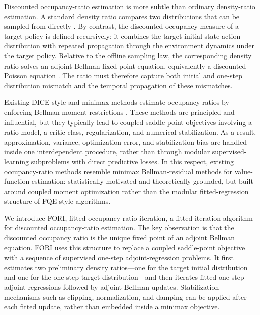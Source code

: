 \documentclass{article}
\newcommand{\1}{\mathbf{1}}
\theoremstyle{plain}
\theoremstyle{definition}
\theoremstyle{remark}
\begin{document}
Discounted occupancy-ratio estimation is more subtle than ordinary density-ratio
estimation. A standard density ratio compares two distributions that can be
sampled from directly
\citep{tsuboiEtAl2008KLIEP,huangEtAl2006KMM,kanamoriEtAl2009LSIF,nguyenEtAl2010ConvexRatio,menonOng2016DensityRatioClassification,sugiyamaEtAl2012DensityRatioBook}.
By contrast, the discounted occupancy measure of a target policy is defined
recursively: it combines the target initial state-action distribution with
repeated propagation through the environment dynamics under the target policy.
Relative to the offline sampling law, the corresponding density ratio solves an
adjoint Bellman fixed-point equation, equivalently a discounted Poisson
equation
\citep{puterman1994MDP,meynTweedieGlynn2009MarkovChains,glynnMeyn1996PoissonEquation,nachumEtAl2019DualDICE,liuEtAl2018InfiniteHorizonOPE}.
The ratio must therefore capture both initial and one-step distribution mismatch and the
temporal propagation of these mismatches.

Existing DICE-style and minimax methods estimate occupancy ratios by enforcing
Bellman moment restrictions
\citep{nachumEtAl2019DualDICE,zhangEtAl2020GenDICE,zhangEtAl2020GradientDICE,yangEtAl2020RegularizedLagrangianDICE,daiEtAl2020CoinDICE,ueharaEtAl2020MWLMQL}.
These methods are principled and influential, but they typically lead to
coupled saddle-point objectives involving a ratio model, a critic class,
regularization, and numerical stabilization. As a result, approximation,
variance, optimization error, and stabilization bias are handled inside one
interdependent procedure, rather than through modular supervised-learning
subproblems with direct predictive losses. In this respect, existing
occupancy-ratio methods resemble minimax Bellman-residual methods for
value-function estimation: statistically motivated and theoretically grounded,
but built around coupled moment optimization rather than the modular
fitted-regression structure of FQE-style algorithms.

We introduce \textsc{FORI}, fitted occupancy-ratio iteration, a fitted-iteration
algorithm for discounted occupancy-ratio estimation. The key observation is that
the discounted occupancy ratio is the unique fixed point of an adjoint Bellman
equation. \textsc{FORI} uses this structure to replace a coupled saddle-point
objective with a sequence of supervised one-step adjoint-regression problems. It first
estimates two preliminary density ratios---one for the target initial
distribution and one for the one-step target distribution---and then iterates
fitted one-step adjoint regressions followed by adjoint Bellman updates. Stabilization
mechanisms such as clipping, normalization, and damping can be applied after
each fitted update, rather than embedded inside a minimax objective.
\end{document}
